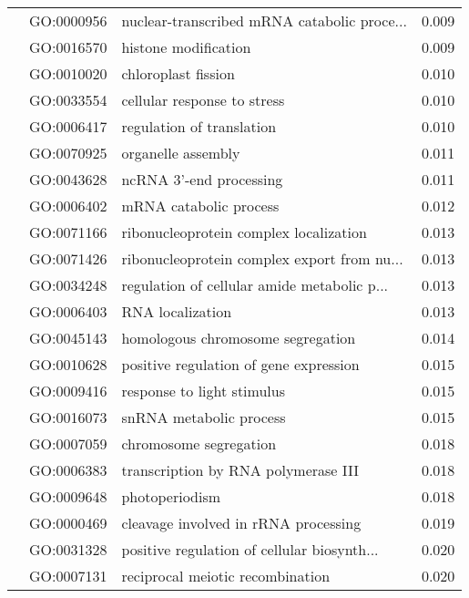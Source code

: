 \begin{longtable}{lllr}
   & GO:0000956 &  nuclear-transcribed mRNA catabolic proce... &         0.009 \\
   & GO:0016570 &                         histone modification &         0.009 \\
   & GO:0010020 &                          chloroplast fission &         0.010 \\
   & GO:0033554 &                  cellular response to stress &         0.010 \\
   & GO:0006417 &                    regulation of translation &         0.010 \\
   & GO:0070925 &                           organelle assembly &         0.011 \\
   & GO:0043628 &                      ncRNA 3'-end processing &         0.011 \\
   & GO:0006402 &                       mRNA catabolic process &         0.012 \\
   & GO:0071166 &       ribonucleoprotein complex localization &         0.013 \\
   & GO:0071426 &  ribonucleoprotein complex export from nu... &         0.013 \\
   & GO:0034248 &  regulation of cellular amide metabolic p... &         0.013 \\
   & GO:0006403 &                             RNA localization &         0.013 \\
   & GO:0045143 &            homologous chromosome segregation &         0.014 \\
   & GO:0010628 &       positive regulation of gene expression &         0.015 \\
   & GO:0009416 &                   response to light stimulus &         0.015 \\
   & GO:0016073 &                      snRNA metabolic process &         0.015 \\
   & GO:0007059 &                       chromosome segregation &         0.018 \\
   & GO:0006383 &          transcription by RNA polymerase III &         0.018 \\
   & GO:0009648 &                               photoperiodism &         0.018 \\
   & GO:0000469 &         cleavage involved in rRNA processing &         0.019 \\
   & GO:0031328 &  positive regulation of cellular biosynth... &         0.020 \\
   & GO:0007131 &             reciprocal meiotic recombination &         0.020 \\

\end{longtable}
